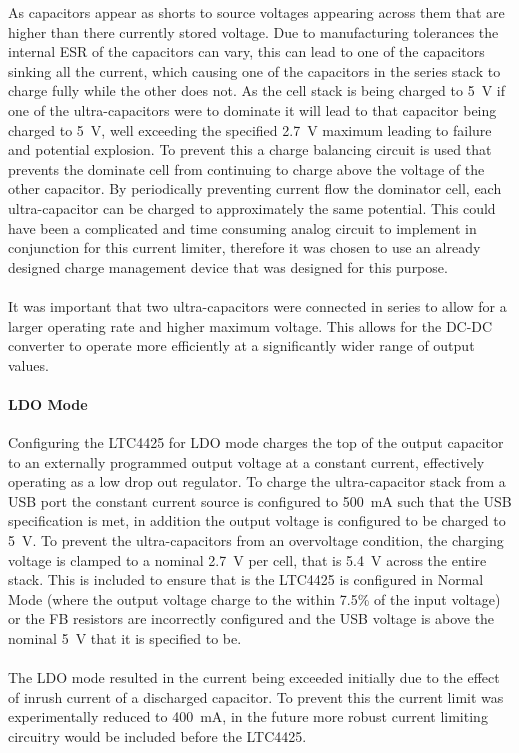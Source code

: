 As capacitors appear as shorts to source voltages appearing across them that are higher than there currently stored voltage. Due to manufacturing tolerances the internal ESR of the capacitors can vary, this can lead to one of the capacitors sinking all the current, which causing one of the capacitors in the series stack to charge fully while the other does not. As the cell stack is being charged to \SI{5}{V} if one of the ultra-capacitors were to dominate it will lead to that capacitor being charged to \SI{5}{V}, well exceeding the specified \SI{2.7}{V} maximum leading to failure and potential explosion. To prevent this a charge balancing circuit is used that prevents the dominate cell from continuing to charge above the voltage of the other capacitor. By periodically preventing current flow the dominator cell, each ultra-capacitor can be charged to approximately the same potential. This could have been a complicated and time consuming analog circuit to implement in conjunction for this current limiter, therefore it was chosen to use an already designed charge management device that was designed for this purpose.
\\ \\
It was important that two ultra-capacitors were connected in series to allow for a larger operating rate and higher maximum voltage. This allows for the DC-DC converter to operate more efficiently at a significantly wider range of output values.

\paragraph{LDO Mode}
Configuring the LTC4425 for LDO mode charges the top of the output capacitor to an externally programmed output voltage at a constant current, effectively operating as a low drop out regulator. To charge the ultra-capacitor stack from a USB port the constant current source is configured to \SI{500}{mA} such that the USB specification is met, in addition the output voltage is configured to be charged to \SI{5}{V}. To prevent the ultra-capacitors from an overvoltage condition, the charging voltage is clamped to a nominal \SI{2.7}{V} per cell, that is \SI{5.4}{V} across the entire stack. This is included to ensure that is the LTC4425 is configured in Normal Mode (where the output voltage charge to the within 7.5\% of the input voltage) or the FB resistors are incorrectly configured and the USB voltage is above the nominal \SI{5}{V} that it is specified to be.
\\ \\
The LDO mode resulted in the current being exceeded initially due to the effect of inrush current of a discharged capacitor. To prevent this the current limit was experimentally reduced to \SI{400}{mA}, in the future more robust current limiting circuitry would be included before the LTC4425.


